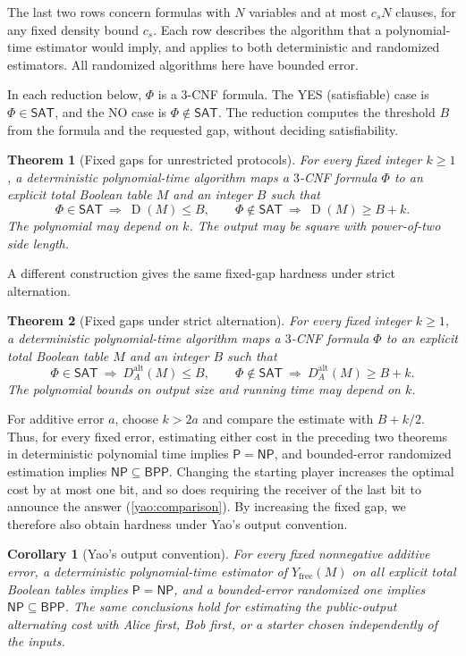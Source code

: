 \documentclass[11pt,letterpaper]{article} \usepackage[utf8]{inputenc}
\theoremstyle{plain} \newtheorem{theorem}{Theorem}[section]
\newtheorem{corollary}[corollary]{Corollary} \aliascntresetthe{corollary}
\theoremstyle{definition} \newaliascnt{definition}{theorem}
\newcommand{\D}{\operatorname{D}}
\newcommand{\NP}{\mathsf{NP}}
\newcommand{\BPP}{\mathsf{BPP}}
\newcommand{\SAT}{\mathsf{SAT}}
\begin{document}
The last two rows concern formulas with $N$ variables and at most $c_sN$
clauses, for any fixed density bound $c_s$. Each row describes the algorithm
that a polynomial-time estimator would imply, and applies to both deterministic and randomized estimators. All randomized algorithms here have bounded error. 

In each reduction below,
$\Phi$ is a $3$-CNF formula. The YES (satisfiable) case is $\Phi\in\SAT$,
and the NO case is $\Phi\notin\SAT$. The reduction computes the threshold
$B$ from the formula and the requested gap, without deciding
satisfiability.

\begin{theorem}[Fixed gaps for unrestricted protocols]
\label{intro:deterministic}
For every fixed integer $k\ge1$, a deterministic polynomial-time algorithm
maps a $3$-CNF formula $\Phi$ to an explicit total Boolean table $M$ and an
integer $B$ such that
\[
\Phi\in\SAT\ \Longrightarrow\ \D(M)\le B,\qquad
\Phi\notin\SAT\ \Longrightarrow\ \D(M)\ge B+k.
\]
The polynomial may depend on $k$. The output may be square with
power-of-two side length.
\end{theorem}

A different construction gives the same fixed-gap hardness under
strict alternation.

\begin{theorem}[Fixed gaps under strict alternation]
\label{yao:main}
For every fixed integer $k\ge1$, a deterministic polynomial-time algorithm
maps a $3$-CNF formula $\Phi$ to an explicit total Boolean table $M$ and an
integer $B$ such that
\[
\Phi\in\SAT\ \Longrightarrow\ D_A^{\mathrm{alt}}(M)\le B,\qquad
\Phi\notin\SAT\ \Longrightarrow\ D_A^{\mathrm{alt}}(M)\ge B+k.
\]
The polynomial bounds on output size and running time may depend on $k$.
\end{theorem}

For additive error $a$, choose $k>2a$ and compare the estimate with
$B+k/2$. Thus, for every fixed error, estimating
either cost in the preceding two theorems in deterministic polynomial time
implies $\mathsf P=\NP$, and bounded-error randomized estimation implies
$\NP\subseteq\BPP$. Changing the starting player increases the optimal cost by at most one
bit, and so does requiring the receiver of the last bit to announce the
answer (\cref{yao:comparison}). By increasing the fixed
gap, we therefore also obtain hardness under Yao's output convention.

\begin{corollary}[Yao's output convention]\label{yao:bpp}
For every fixed nonnegative additive error, a deterministic polynomial-time
estimator of $Y_{\mathrm{free}}(M)$ on all explicit total Boolean tables
implies $\mathsf P=\NP$, and a bounded-error randomized one implies
$\NP\subseteq\BPP$. The same conclusions hold for estimating the public-output
alternating cost with Alice first, Bob first, or a starter chosen
independently of the inputs.
\end{corollary}
\end{document}
